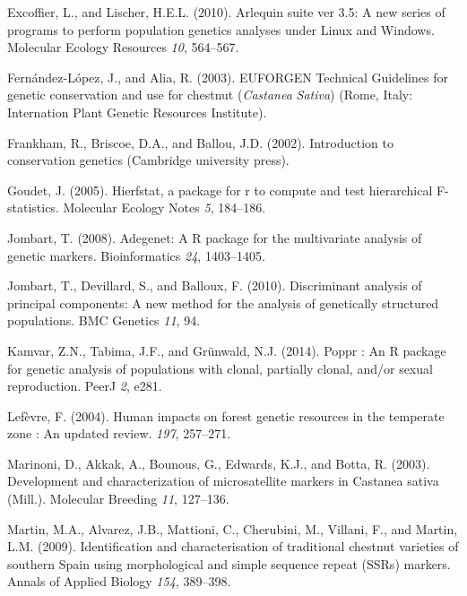 \documentclass[12pt,a4paper,]{report}
\begin{document}
\leavevmode\hypertarget{ref-excoffier_arlequin_2010}{}%
Excoffier, L., and Lischer, H.E.L. (2010). Arlequin suite ver 3.5: A new
series of programs to perform population genetics analyses under Linux
and Windows. Molecular Ecology Resources \emph{10}, 564--567.

\leavevmode\hypertarget{ref-fernandez-lopez_euforgen_2003}{}%
Fernández-López, J., and Alia, R. (2003). EUFORGEN Technical Guidelines
for genetic conservation and use for chestnut (\emph{Castanea}
\emph{Sativa}) (Rome, Italy: Internation Plant Genetic Resources
Institute).

\leavevmode\hypertarget{ref-frankham_introduction_2002}{}%
Frankham, R., Briscoe, D.A., and Ballou, J.D. (2002). Introduction to
conservation genetics (Cambridge university press).

\leavevmode\hypertarget{ref-goudet_hierfstat_2005}{}%
Goudet, J. (2005). Hierfstat, a package for r to compute and test
hierarchical F-statistics. Molecular Ecology Notes \emph{5}, 184--186.

\leavevmode\hypertarget{ref-Jombart2008}{}%
Jombart, T. (2008). Adegenet: A R package for the multivariate analysis
of genetic markers. Bioinformatics \emph{24}, 1403--1405.

\leavevmode\hypertarget{ref-Jombart2010}{}%
Jombart, T., Devillard, S., and Balloux, F. (2010). Discriminant
analysis of principal components: A new method for the analysis of
genetically structured populations. BMC Genetics \emph{11}, 94.

\leavevmode\hypertarget{ref-Kamvar2014}{}%
Kamvar, Z.N., Tabima, J.F., and Grünwald, N.J. (2014). Poppr : An R
package for genetic analysis of populations with clonal, partially
clonal, and/or sexual reproduction. PeerJ \emph{2}, e281.

\leavevmode\hypertarget{ref-Lefevre2004}{}%
Lefèvre, F. (2004). Human impacts on forest genetic resources in the
temperate zone : An updated review. \emph{197}, 257--271.

\leavevmode\hypertarget{ref-marinoni_development_2003}{}%
Marinoni, D., Akkak, A., Bounous, G., Edwards, K.J., and Botta, R.
(2003). Development and characterization of microsatellite markers in
Castanea sativa (Mill.). Molecular Breeding \emph{11}, 127--136.

\leavevmode\hypertarget{ref-martin_identification_2009}{}%
Martin, M.A., Alvarez, J.B., Mattioni, C., Cherubini, M., Villani, F.,
and Martin, L.M. (2009). Identification and characterisation of
traditional chestnut varieties of southern Spain using morphological and
simple sequence repeat (SSRs) markers. Annals of Applied Biology
\emph{154}, 389--398.
\end{document}
